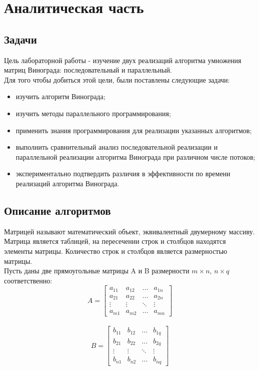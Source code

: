 \documentclass[12pt, a4paper]{report}
\begin{document}
    \chapter{Аналитическая часть}
	\section{Задачи}
	Цель лабораторной работы - изучение двух реализаций алгоритма умножения матриц Винограда: последовательный и параллельный.\\
	Для того чтобы добиться этой цели, были поставлены следующие задачи:
	\begin{itemize}
		\item изучить алгоритм Винограда;
		\item изучить методы параллельного программирования;
		\item применить знания программирования для реализации указанных алгоритмов;
		\item выполнить сравнительный анализ последовательной реализации и параллельной реализации алгоритма Винограда при различном числе потоков;
		\item экспериментально подтвердить различия в эффективности по времени реализаций алгоритма Винограда.
	\end{itemize}

	\section{Описание алгоритмов}
	
	Матрицей называют математический объект, эквивалентный двумерному массиву. Матрица является таблицей, на пересечении строк и столбцов находятся элементы матрицы. Количество строк и столбцов является размерностью матрицы.\\
	Пусть даны две прямоугольные матрицы A и B размерности $m \times n$, $n \times q$
	соответственно:\\
	$$A =  \begin{bmatrix} 
	a_{11}& a_{12} &\ldots & a_{1n}\\ 
	a_{21}& a_{22} &\ldots & a_{2n}\\ 
	\vdots& \vdots &\ddots & \vdots\\ 
	a_{m1}& a_{m2} &\ldots & a_{mn} 
	\end{bmatrix} $$\\	
	
	$$B = \begin{bmatrix} 
	b_{11}& b_{12} &\ldots & b_{1q}\\ 
	b_{21}& b_{22} &\ldots & b_{2q}\\ 
	\vdots& \vdots &\ddots & \vdots\\ 
	b_{n1}& b_{n2} &\ldots & b_{nq} 
	\end{bmatrix} $$\\
	
\end{document}
